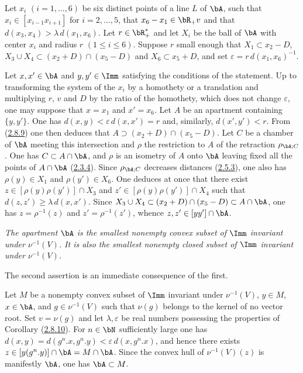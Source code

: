 \documentclass[12pt,a4paper,oneside,english]{smfart}
\makeatletter
\newcommand{\btanchor}[1]{\leavevmode\Hy@raisedlink{\hypertarget{bt:#1}{}}}
\newcommand{\btref}[1]{\hyperlink{bt:#1}{#1}}
\theoremstyle{definition}
\theoremstyle{bt}
\makeatother
\begin{document}
\medskip
Let $x_i$ $(i=1,\dots,6)$ be six distinct points of a line $L$ of $\bA$, such
that $x_i\in[x_{i-1}x_{i+1}]$ for $i=2,\dots,5$, that $x_6-x_1\in\bR_+v$ and
that $d(x_3,x_4)>\lambda\, d(x_1,x_6)$. Let $r\in\bR^{*}_+$ and let $X_i$ be
the ball of $\bA$ with center $x_i$ and radius $r$ $(1\le i\le 6)$. Suppose
$r$ small enough that $X_1\subset x_2-D$,
$X_3\cup X_4\subset(x_2+D)\cap(x_5-D)$ and $X_6\subset x_5+D$, and set
$\varepsilon=r\, d(x_1,x_6)^{-1}$.

Let $x,x'\in\bA$ and $y,y'\in\Imm$ satisfying the conditions of the statement.
Up to transforming the system of the $x_i$ by a homothety or a translation and
multiplying $r$, $v$ and $D$ by the ratio of the homothety, which does not
change $\varepsilon$, one may suppose that $x=x_1$ and $x'=x_6$. Let $A$ be an
apartment containing $\{y,y'\}$. One has $d(x,y)<\varepsilon\, d(x,x')=r$ and,
similarly, $d(x',y')<r$. From (\btref{2.8.9}) one then deduces that
$A\supset(x_2+D)\cap(x_5-D)$. Let $C$ be a chamber of $\bA$ meeting this
intersection and $\rho$ the restriction to $A$ of the retraction
$\rho_{\bA;C}$. One has $C\subset A\cap\bA$, and $\rho$ is an isometry of $A$
onto $\bA$ leaving fixed all the points of $A\cap\bA$ (\btref{2.3.4}). Since
$\rho_{\bA;C}$ decreases distances (\btref{2.5.3}), one also has $\rho(y)\in X_1$ and
$\rho(y')\in X_6$. One deduces at once that there exist
$z\in[\rho(y)\rho(y')]\cap X_3$ and $z'\in[\rho(y)\rho(y')]\cap X_4$ such that
$d(z,z')\ge\lambda\, d(x,x')$. Since
$X_3\cup X_4\subset(x_2+D)\cap(x_5-D)\subset A\cap\bA$, one has
$z=\rho^{-1}(z)$ and $z'=\rho^{-1}(z')$, whence $z,z'\in[yy']\cap\bA$.

\btanchor{2.8.11}
\emph{The apartment $\bA$ is the smallest nonempty convex subset of $\Imm$
invariant under $\nu^{-1}(V)$. It is also the smallest nonempty closed subset
of $\Imm$ invariant under $\nu^{-1}(V)$.}

\medskip
The second assertion is an immediate consequence of the first.

Let $M$ be a nonempty convex subset of $\Imm$ invariant under $\nu^{-1}(V)$,
$y\in M$, $x\in\bA$, and $g\in\nu^{-1}(V)$ such that $\nu(g)$ belongs to the
kernel of no vector root. Set $v=\nu(g)$ and let $\lambda,\varepsilon$ be real
numbers possessing the properties of Corollary (\btref{2.8.10}). For $n\in\bN$
sufficiently large one has
$d(x,y)=d(g^n.x,g^n.y)<\varepsilon\, d(x,g^n.x)$, and hence there exists
$z\in[y(g^n.y)]\cap\bA=M\cap\bA$. Since the convex hull of $\nu^{-1}(V)(z)$ is
manifestly $\bA$, one has $\bA\subset M$.
\end{document}
